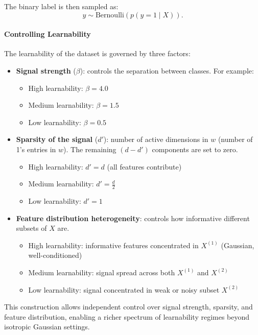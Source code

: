 \documentclass{article}
\begin{document}
The binary label is then sampled as:
\[
y \sim \mathrm{Bernoulli}(p(y=1\mid X)).
\]

\paragraph{Controlling Learnability}
The learnability of the dataset is governed by three factors:

\begin{itemize}
    \item \textbf{Signal strength} ($\beta$): controls the separation between classes. For example:
    \begin{itemize}
        \item High learnability: $\beta = 4.0$
        \item Medium learnability: $\beta = 1.5$
        \item Low learnability: $\beta = 0.5$
    \end{itemize}

    \item \textbf{Sparsity of the signal} ($d'$): number of active dimensions in $w$ (number of 1's entries in $w$).
    The remaining $(d - d')$ components are set to zero.
    \begin{itemize}
        \item High learnability:   $d' = d$ (all features contribute)
        \item Medium learnability: $d' = \frac{d}{2}$
        \item Low learnability:    $d' = 1$
    \end{itemize}

    \item \textbf{Feature distribution heterogeneity}: controls how informative different subsets of $X$ are.
    \begin{itemize}
        \item High learnability: informative features concentrated in $X^{(1)}$ (Gaussian, well-conditioned)
        \item Medium learnability: signal spread across both $X^{(1)}$ and $X^{(2)}$
        \item Low learnability: signal concentrated in weak or noisy subset $X^{(2)}$
    \end{itemize}
\end{itemize}

This construction allows independent control over signal strength, sparsity, and feature distribution, enabling a richer spectrum of learnability regimes beyond isotropic Gaussian settings.
\end{document}
